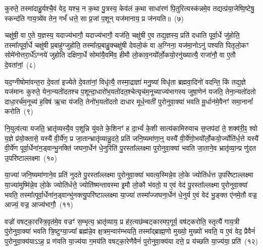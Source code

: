 कुरुते॒ तस्मा॑दाहु॒र्यश्चै॒वं वेद॒ यश्च॒ न क॒था पु॒त्रस्य॒ केव॑लं क॒था साधा॑रणं पि॒तुरित्यस्क॑न्नमे॒व तद्यत्प्र॑या॒जेष्वि॒ष्टेषु॒ स्कन्द॑ति गाय॒त्र्ये॑व तेन॒ गर्भं॑ धत्ते॒ सा प्र॒जां प॒शून् यज॑मानाय॒ प्र ज॑नयति॥~(७)\ip

{}

चक्षु॑षी॒ वा ए॒ते य॒ज्ञस्य॒ यदाज्य॑भागौ॒ यदाज्य॑भागौ॒ यज॑ति॒ चक्षु॑षी ए॒व तद्य॒ज्ञस्य॒ प्रति॑ दधाति पूर्वा॒र्धे जु॑होति॒ तस्मा᳚त्पूर्वा॒र्धे चक्षु॑षी प्र॒बाहु॑ग्जुहोति॒ तस्मा᳚त्प्र॒बाहु॒क्चक्षु॑षी देवलो॒कं वा अ॒ग्निना॒ यज॑मा॒नो\-ऽनु॑ पश्यति पितृलो॒कꣳ सोमे॑नोत्तरा॒र्धे᳚\-ऽग्नये॑ जुहोति दक्षिणा॒र्धे सोमा॑यै॒वमि॑व॒ हीमौ लो॒काव॒नयो᳚र्लो॒कयो॒रनु॑ख्यात्यै॒ राजा॑नौ॒ वा ए॒तौ दे॒वता॑नां॒~(८)\ip

यद॒ग्नी\-षोमा॑वन्त॒रा दे॒वता॑ इज्येते दे॒वता॑नां॒ विधृ॑त्यै॒ तस्मा॒द्राज्ञा॑ मनु॒ष्या॑ विधृ॑ता ब्रह्मवा॒दिनो॑ वदन्ति॒ किं तद्य॒ज्ञे यज॑मानः कुरुते॒ येना॒न्यतो॑दतश्च प॒शून्दा॒धारो॑भ॒यतो॑\-दत॒श्चेत्यृच॑\-म॒नूच्याज्य॑\-भागस्य जुषा॒णेन॑ यजति॒ तेना॒न्यतो॑दतो दाधा॒रर्च॑म॒नूच्य॑ ह॒विष॑ ऋ॒चा य॑जति॒ तेनो॑भ॒यतो॑दतो दाधार मूर्ध॒न्वती॑ पुरोनुवा॒क्या॑ भवति मू॒र्धान॑मे॒वैनꣳ॑ समा॒नानां᳚ करोति~(९)\ip

नि॒युत्व॑त्या यजति॒ भ्रातृ॑व्यस्यै॒व प॒शून्नि यु॑वते के॒शिनꣳ॑ ह दा॒र्भ्यं के॒शी सात्य॑कामिरुवाच स॒प्तप॑दां ते॒ शक्व॑री॒ꣴ॒ श्वो य॒ज्ञे प्र॑यो॒क्तासे॒ यस्यै॑ वी॒र्ये॑ण॒ प्र जा॒तान्भ्रातृ॑व्यान्नु॒दते॒ प्रति॑ जनि॒ष्यमा॑णा॒न्॒ यस्यै॑ वी॒र्ये॑णो॒भयो᳚र्लो॒कयो॒र्ज्योति॑र्ध॒त्ते यस्यै॑ वी॒र्ये॑ण पूर्वा॒र्धेना॑न॒ड्वान्भु॒नक्ति॑ जघना॒र्धेन॑ धे॒नुरिति॑ पु॒रस्ता᳚ल्लक्ष्मा पुरोनुवा॒क्या॑ भवति जा॒ताने॒व भ्रातृ॑व्या॒न्प्र णु॑दत उ॒परि॑ष्टाल्लक्ष्मा~(१०)\ip

या॒ज्या॑ जनि॒ष्यमा॑णाने॒व प्रति॑ नुदते पु॒रस्ता᳚ल्लक्ष्मा पुरोनुवा॒क्या॑ भवत्य॒स्मिन्ने॒व लो॒के ज्योति॑र्धत्त उ॒परि॑ष्टाल्लक्ष्मा या॒ज्या॑मुष्मि॑न्ने॒व लो॒के ज्योति॑र्धत्ते॒ ज्योति॑ष्मन्तावस्मा इ॒मौ लो॒कौ भ॑वतो॒ य ए॒वं वेद॑ पु॒रस्ता᳚ल्लक्ष्मा पुरोनुवा॒क्या॑ भवति॒ तस्मा᳚त्पूर्वा॒र्धेना॑न॒ड्वान्भु॑नक्त्यु॒परि॑ष्टाल्लक्ष्मा या॒ज्या॑ तस्मा᳚ज्जघना॒र्धेन॑ धे॒नुर्य ए॒वं वेद॑ भु॒ङ्क्त ए॑नमे॒तौ वज्र॒ आज्यं॒ वज्र॒ आज्य॑भागौ॒~(११)\ip

वज्रो॑ वषट्का॒रस्त्रि॒वृत॑मे॒व वज्रꣳ॑ स॒म्भृत्य॒ भ्रातृ॑व्याय॒ प्र ह॑र॒त्यछ॑म्बट्कारमप॒गूर्य॒ वष॑ट्करोति॒ स्तृत्यै॑ गाय॒त्री पु॑रोनुवा॒क्या॑ भवति त्रि॒ष्टुग्या॒ज्या᳚ ब्रह्म॑न्ने॒व क्ष॒त्रम॒न्वार॑म्भयति॒ तस्मा᳚द्\-ब्राह्म॒णो मुख्यो॒ मुख्यो॑ भवति॒ य ए॒वं वेद॒ प्रैवैनं॑ पुरोनुवा॒क्य॑या\-ऽऽ\-ह॒ प्र ण॑यति या॒ज्य॑या ग॒मय॑ति वषट्का॒रेणैवैनं॑ पुरोनुवा॒क्य॑या दत्ते॒ प्र य॑च्छति या॒ज्य॑या॒ प्रति॑~(१२)\ip

